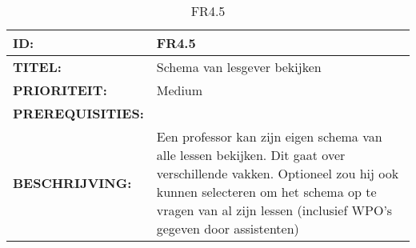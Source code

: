 \noindent\begin{table}[h]
            \begin{tabular}{l | p{10cm}}
                \textbf{ID:} & FR4.5 \\ \hline
                \textbf{TITEL:} & Schema van lesgever bekijken\\ \hline
                \textbf{PRIORITEIT:} &  Medium \\ \hline
                \textbf{PREREQUISITIES:} & \\ \hline
                \textbf{BESCHRIJVING:} & Een professor kan zijn eigen schema van alle lessen bekijken. Dit gaat over verschillende vakken. Optioneel zou hij ook kunnen selecteren om het schema op te vragen van al zijn lessen (inclusief WPO's gegeven door assistenten) \\ 
            \end{tabular}\\
            \caption{FR4.5}
            \label{tab:FR4.5}
        \end{table}
        

